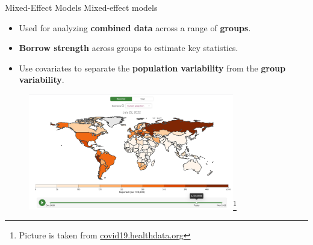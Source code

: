 \documentclass[8pt]{beamer}
\begin{document}
\begin{frame}{Mixed-Effect Models}
Mixed-effect models
\begin{itemize}
	\item Used for analyzing \textbf{combined data} across a range of \textbf{groups}.
	\item \textbf{Borrow strength} across groups to estimate key statistics. %
	\item Use covariates to separate the \textbf{population variability} from the \textbf{group variability}.

\end{itemize}

\begin{figure}
	\centering
	\includegraphics[width=0.8\textwidth]{Figures/ihme_predictions.png}\footnote{Picture is taken from \href{covid19.healthdata.org}{covid19.healthdata.org} }
\end{figure}

\end{frame}
\end{document}
